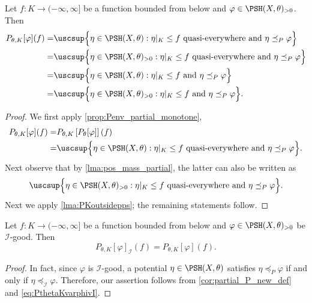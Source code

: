 \begin{corollary}\label{cor:partial_P_new_def}
    Let $f\colon K\rightarrow (-\infty,\infty]$ be a function bounded from below and $\varphi \in \PSH(X,\theta)_{>0}$. Then
    \[
    \begin{aligned}
    P_{\theta,K}[\varphi](f)= & \uscsup \Bigl\{ \eta \in \PSH(X,\theta): \eta|_K \leq f  \textup{ quasi-everywhere and } \eta\preceq_P \varphi\Bigr\}\\
    =& \uscsup \Bigl\{ \eta \in \PSH(X,\theta)_{>0}: \eta|_K \leq f  \textup{ quasi-everywhere and } \eta\preceq_P \varphi\Bigr\}\\
    =& \uscsup \Bigl\{ \eta \in \PSH(X,\theta): \eta|_K \leq f  \textup{ and } \eta\preceq_P \varphi\Bigr\}\\
    =& \uscsup \Bigl\{ \eta \in \PSH(X,\theta)_{>0}: \eta|_K \leq f  \textup{ and } \eta\preceq_P \varphi\Bigr\}.
    \end{aligned}
    \]
\end{corollary}
\begin{proof}
    We first apply \cref{prop:Penv_partial_monotone},
    \[
    \begin{split}
    P_{\theta,K}[\varphi](f)= & P_{\theta,K}\left[P_{\theta}[\varphi]\right](f)\\
    =& \uscsup \Bigl\{ \eta \in \PSH(X,\theta): \eta|_K \leq f  \textup{ quasi-everywhere and } \eta\preceq_P \varphi\Bigr\}.
    \end{split}
    \]
    Next observe that by \cref{lma:pos_mass_partial}, the latter can also be written as
    \[
    \uscsup \Bigl\{ \eta \in \PSH(X,\theta)_{>0}: \eta|_K \leq f  \textup{ quasi-everywhere and } \eta\preceq_P \varphi\Bigr\}.
    \]
    Next we apply \cref{lma:PKoutsidepps}; the remaining statements follow.
\end{proof}

\begin{corollary}\label{cor:I-good_partial_env}
    Let $f\colon K\rightarrow (-\infty,\infty]$ be a function bounded from below and $\varphi \in \PSH(X,\theta)_{>0}$ be $\mathcal{I}$-good. Then
    \[
        P_{\theta,K}[\varphi]_{\mathcal{I}}(f)=P_{\theta,K}[\varphi](f).
    \]
\end{corollary}
\begin{proof}
    In fact, since $\varphi$ is $\mathcal{I}$-good, a potential $\eta\in \PSH(X,\theta)$ satisfies $\eta\preceq_P \varphi$ if and only if $\eta\preceq_{\mathcal{I}} \varphi$. Therefore, our assertion follows from \cref{cor:partial_P_new_def} and \eqref{eq:PthetaKvarphivI}.
\end{proof}



